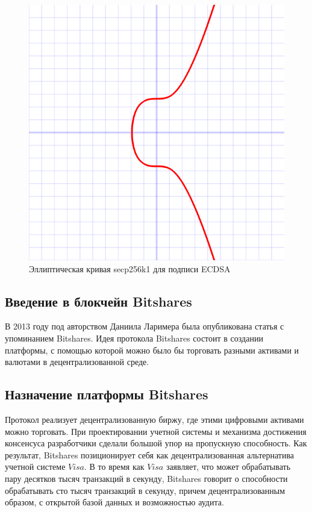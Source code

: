 \documentclass[a4paper, 14pt]{extarticle}
\begin{document}
\begin{figure}[h]
    \centering
    \includegraphics[scale=0.4]{Secp256k1.png}
    \caption{Эллиптическая кривая secp256k1 для подписи ECDSA}
    \label{fig:secp256k1}
\end{figure}

\subsection{Введение в блокчейн Bitshares}
В 2013 году под авторством Даниила Ларимера была опубликована статья с упоминанием Bitshares. Идея протокола Bitshares состоит в создании платформы, с помощью которой можно было бы торговать разными активами и валютами в децентрализованной среде.

\subsection{Назначение платформы Bitshares}
Протокол реализует децентрализованную биржу, где этими цифровыми активами можно торговать. При проектировании учетной системы и механизма достижения консенсуса разработчики сделали большой упор на пропускную способность. Как результат, Bitshares позиционирует себя как децентрализованная альтернатива учетной системе $Visa$. В то время как $Visa$ заявляет, что может обрабатывать пару десятков тысяч транзакций в секунду, Bitshares говорит о способности обрабатывать сто тысяч транзакций в секунду, причем децентрализованным образом, с открытой базой данных и возможностью аудита.
\end{document}
